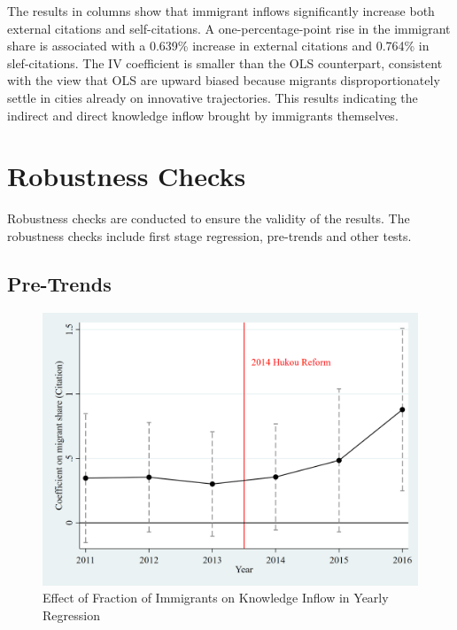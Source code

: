 \documentclass[12pt]{article}
\begin{document}
The results in columns show that immigrant inflows significantly increase both external citations and self-citations. A one-percentage-point rise in the immigrant share is associated with a 0.639\% increase in external citations and 0.764\% in slef-citations. The IV coefficient is smaller than the OLS counterpart, consistent with the view that OLS are upward biased because migrants disproportionately settle in cities already on innovative trajectories. This results indicating the indirect and direct knowledge inflow brought by immigrants themselves. 

\section{Robustness Checks} \label{sec:robustness}

Robustness checks are conducted to ensure the validity of the results. The robustness checks include first stage regression, pre-trends and other tests.


\subsection{Pre-Trends}

\begin{figure}[htbp!]
  \centering
  \includegraphics[width=.6\textwidth]{../Analysis/output/pre_trend_iv.png}
  \caption{Effect of Fraction of Immigrants on Knowledge Inflow in Yearly Regression}
  \label{fig:pre_trend}
\end{figure}


%    
\end{document}

